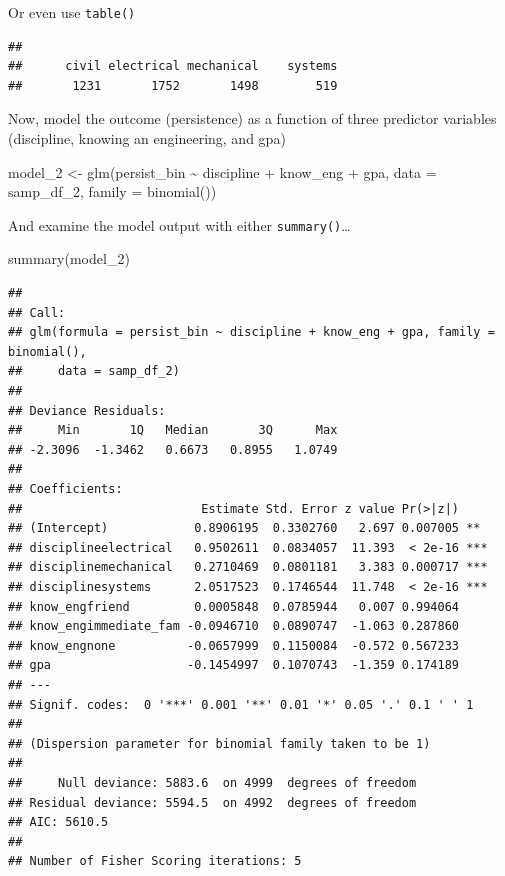 \documentclass[
]{book}
\newenvironment{Shaded}{\begin{snugshade}}{\end{snugshade}}
\newcommand{\AttributeTok}[1]{\textcolor[rgb]{0.77,0.63,0.00}{#1}}
\newcommand{\FunctionTok}[1]{\textcolor[rgb]{0.00,0.00,0.00}{#1}}
\newcommand{\NormalTok}[1]{#1}
\newcommand{\OtherTok}[1]{\textcolor[rgb]{0.56,0.35,0.01}{#1}}
\newcommand{\SpecialCharTok}[1]{\textcolor[rgb]{0.00,0.00,0.00}{#1}}
\begin{document}
Or even use \texttt{table()}

\begin{Shaded}
\end{Shaded}

\begin{verbatim}
## 
##      civil electrical mechanical    systems 
##       1231       1752       1498        519
\end{verbatim}

Now, model the outcome (persistence) as a function of three predictor variables (discipline, knowing an engineering, and gpa)

\begin{Shaded}
\begin{Highlighting}[]
\NormalTok{model\_2 }\OtherTok{\textless{}{-}} \FunctionTok{glm}\NormalTok{(persist\_bin }\SpecialCharTok{\textasciitilde{}}\NormalTok{ discipline }\SpecialCharTok{+}\NormalTok{ know\_eng }\SpecialCharTok{+}\NormalTok{ gpa, }\AttributeTok{data =}\NormalTok{ samp\_df\_2, }\AttributeTok{family =} \FunctionTok{binomial}\NormalTok{())}
\end{Highlighting}
\end{Shaded}

And examine the model output with either \texttt{summary()}\ldots{}

\begin{Shaded}
\begin{Highlighting}[]
\FunctionTok{summary}\NormalTok{(model\_2)}
\end{Highlighting}
\end{Shaded}

\begin{verbatim}
## 
## Call:
## glm(formula = persist_bin ~ discipline + know_eng + gpa, family = binomial(), 
##     data = samp_df_2)
## 
## Deviance Residuals: 
##     Min       1Q   Median       3Q      Max  
## -2.3096  -1.3462   0.6673   0.8955   1.0749  
## 
## Coefficients:
##                         Estimate Std. Error z value Pr(>|z|)    
## (Intercept)            0.8906195  0.3302760   2.697 0.007005 ** 
## disciplineelectrical   0.9502611  0.0834057  11.393  < 2e-16 ***
## disciplinemechanical   0.2710469  0.0801181   3.383 0.000717 ***
## disciplinesystems      2.0517523  0.1746544  11.748  < 2e-16 ***
## know_engfriend         0.0005848  0.0785944   0.007 0.994064    
## know_engimmediate_fam -0.0946710  0.0890747  -1.063 0.287860    
## know_engnone          -0.0657999  0.1150084  -0.572 0.567233    
## gpa                   -0.1454997  0.1070743  -1.359 0.174189    
## ---
## Signif. codes:  0 '***' 0.001 '**' 0.01 '*' 0.05 '.' 0.1 ' ' 1
## 
## (Dispersion parameter for binomial family taken to be 1)
## 
##     Null deviance: 5883.6  on 4999  degrees of freedom
## Residual deviance: 5594.5  on 4992  degrees of freedom
## AIC: 5610.5
## 
## Number of Fisher Scoring iterations: 5
\end{verbatim}
\end{document}

